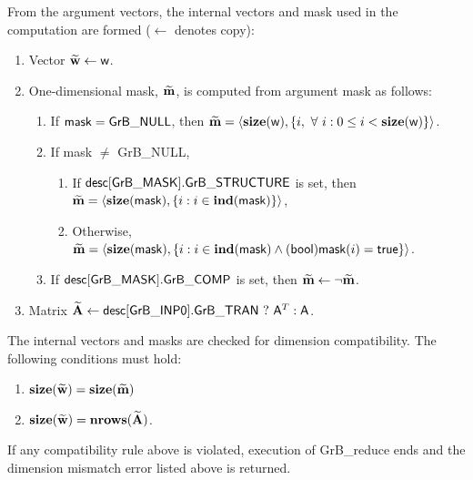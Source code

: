 From the argument vectors, the internal vectors and mask used in 
the computation are formed ($\leftarrow$ denotes copy):
\begin{enumerate}
	\item Vector ${\bf \widetilde{w}} \leftarrow {\sf w}$.

	\item One-dimensional mask, ${\bf \widetilde{m}}$, is computed from 
    argument {\sf mask} as follows:
	\begin{enumerate}
		\item If ${\sf mask} = {\sf GrB\_NULL}$, then ${\bf \widetilde{m}} = 
        \langle \bold{size}({\sf w}), \{i, \ \forall \ i : 0 \leq i < 
        \bold{size}({\sf w}) \} \rangle$.

		\item If {\sf mask} $\ne$ {\sf GrB\_NULL},  
        \begin{enumerate}
            \item If ${\sf desc[GrB\_MASK].GrB\_STRUCTURE}$ is set, then
            ${\bf \widetilde{m}} = 
            \langle \bold{size}({\sf mask}), \{i : i \in \bold{ind}({\sf mask}) \} \rangle$,
            \item Otherwise, ${\bf \widetilde{m}} = 
            \langle \bold{size}({\sf mask}), \{i : i \in \bold{ind}({\sf mask}) \wedge
            ({\sf bool}){\sf mask}(i) = {\sf true} \} \rangle$.
        \end{enumerate}

		\item	If ${\sf desc[GrB\_MASK].GrB\_COMP}$ is set, then 
        ${\bf \widetilde{m}} \leftarrow \neg {\bf \widetilde{m}}$.
	\end{enumerate}

	\item Matrix ${\bf \widetilde{A}} \leftarrow 
    {\sf desc[GrB\_INP0].GrB\_TRAN} \ ? \ {\sf A}^T : {\sf A}$.
\end{enumerate}

The internal vectors and masks are checked for dimension compatibility. 
The following conditions must hold:
\begin{enumerate}
	\item $\bold{size}({\bf \widetilde{w}}) = \bold{size}({\bf \widetilde{m}})$
    \item $\bold{size}({\bf \widetilde{w}}) = \bold{nrows}({\bf \widetilde{A}})$.
\end{enumerate}
If any compatibility rule above is violated, execution of {\sf GrB\_reduce} ends and 
the dimension mismatch error listed above is returned.


